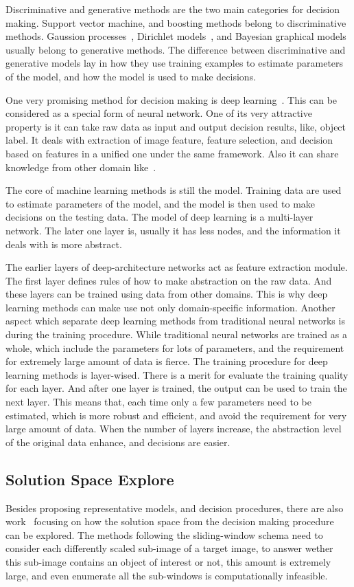 Discriminative and generative methods are the two main categories for decision making.
Support vector machine, and boosting methods belong to discriminative methods. Gaussion processes~\cite{gprocess}, Dirichlet models~\cite{lda,dp,hdp}, and Bayesian graphical models~\cite{bgm} usually belong to generative methods. The difference between discriminative and generative models lay in how they use training examples to estimate parameters of the model, and how the model is used to make decisions.

One very promising method for decision making is deep learning~\cite{dlearn}. This can be considered as a special form of neural network. One of its very attractive property is it can take raw data as input and output decision results, like, object label. It deals with extraction of image feature, feature selection, and decision based on features in a unified one under the same framework. Also it can share knowledge from other domain like~\cite{tlsurvey}.

The core of machine learning methods is still the model. Training data are used to estimate  parameters of the model, and the model is then used to make decisions on the testing data. The model of deep learning is a multi-layer network. The later one layer is, usually it has less nodes, and the information it deals with is more abstract.

The earlier layers of deep-architecture networks act as feature extraction module. The first layer defines rules of how to make abstraction on the raw data. And these layers can be trained using  data from other domains. This is why deep learning methods can make use not only domain-specific information. Another aspect which separate deep learning methods from traditional neural networks is during the training procedure. While traditional neural networks are trained as a whole, which include the parameters for lots of parameters, and the requirement for extremely large amount of data is fierce. The training procedure for deep learning methods is layer-wised. There is a merit for evaluate the training quality for each layer. And after one layer is trained, the output can be used to train the next layer. This means that, each time only a few parameters need to be estimated, which is more robust and efficient, and avoid the requirement for very large amount of data. When the number of layers increase, the abstraction level of the original data enhance, and decisions are easier.
\subsection{Solution Space Explore}
Besides proposing representative models, and decision procedures, there are also work~\cite{408,spm,ciod} focusing on how the solution space from the decision making procedure can be explored. The methods following the sliding-window schema need to consider each differently scaled sub-image of a target image, to answer wether this sub-image contains an object of interest or not, this amount is extremely large, and even enumerate all the sub-windows is computationally infeasible.

